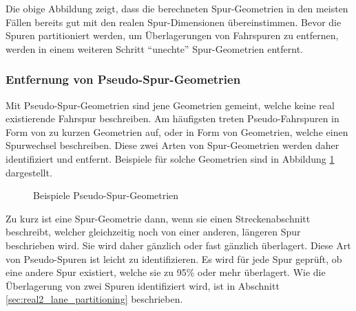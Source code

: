 Die obige Abbildung zeigt, dass die berechneten Spur-Geometrien in den meisten Fällen bereits gut
mit den realen Spur-Dimensionen übereinstimmen. Bevor die Spuren partitioniert werden, um Überlagerungen
von Fahrspuren zu entfernen, werden in einem weiteren Schritt ``unechte'' Spur-Geometrien entfernt.

\subsubsection{Entfernung von Pseudo-Spur-Geometrien}

Mit Pseudo-Spur-Geometrien sind jene Geometrien gemeint, welche keine real existierende Fahrspur beschreiben.
Am häufigsten treten Pseudo-Fahrspuren in Form von zu kurzen Geometrien auf, oder in Form von Geometrien,
welche einen Spurwechsel beschreiben. Diese zwei Arten von Spur-Geometrien werden daher identifiziert
und entfernt. Beispiele für solche Geometrien sind in Abbildung \ref{fig:real2_unreal_geometries} dargestellt.

\begin{figure}[H]
    \centering
    \qquad \qquad
    \caption{Beispiele Pseudo-Spur-Geometrien}
    \label{fig:real2_unreal_geometries}
\end{figure}

Zu kurz ist eine Spur-Geometrie dann, wenn sie einen Streckenabschnitt beschreibt, welcher
gleichzeitig noch von einer anderen, längeren Spur beschrieben wird. Sie wird daher
gänzlich oder fast gänzlich überlagert. Diese Art von Pseudo-Spuren ist leicht zu identifizieren.
Es wird für jede Spur geprüft, ob eine andere Spur existiert, welche sie zu 95\% oder mehr überlagert.
Wie die Überlagerung von zwei Spuren identifiziert wird, ist in Abschnitt \ref{sec:real2_lane_partitioning}
beschrieben.

